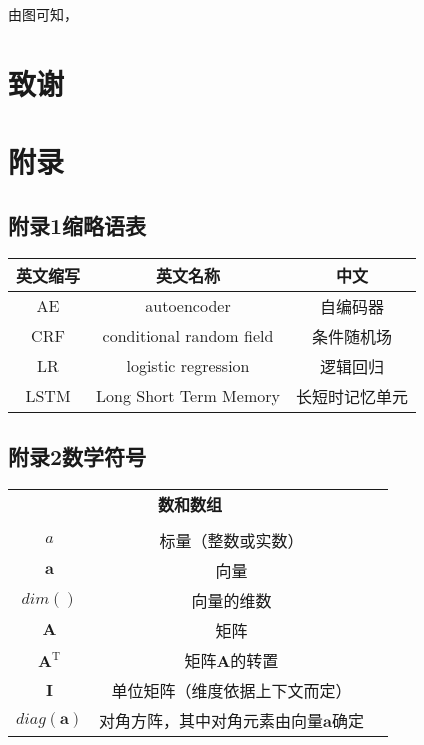 \documentclass[a4paper,AutoFakeBold,oneside,12pt]{book}
\begin{document}
  由图可知， 
\clearpage{}


\clearpage{}
\chapter*{致\qquad{}谢}
\normalsize\thankwords

\chapter*{附\qquad{}录}

{}
\section*{附录1\quad{}缩略语表}
\begin{center}
	\begin{tabular}{ccc}
		\textbf{英文缩写} & \textbf{英文名称} & \textbf{中文} \\
		\hline
		AE & autoencoder & 自编码器\\
		CRF & conditional random field & 条件随机场\\
		LR & logistic regression & 逻辑回归\\
		LSTM & Long Short Term Memory & 长短时记忆单元 \\
	\end{tabular}
\end{center}

{}
\section*{附录2\quad{}数学符号}
\begin{center}
	\begin{tabular}{ccc}
		\multicolumn{2}{c}{\textbf{数和数组}} \\
		\\
		$a$ & 标量（整数或实数）\\
		$\bm{a}$ & 向量\\
		$dim()$ & 向量的维数\\
		$\bm{A}$ & 矩阵\\
		$\bm{A}^\mathrm{T}$ & 矩阵$\textbf{A}$的转置\\
		$\bm{I}$ & 单位矩阵（维度依据上下文而定） \\
 		$diag(\bm{a})$ & 对角方阵，其中对角元素由向量$\bm{a}$确定 \\

	\end{tabular}
\end{center}
\end{document}
